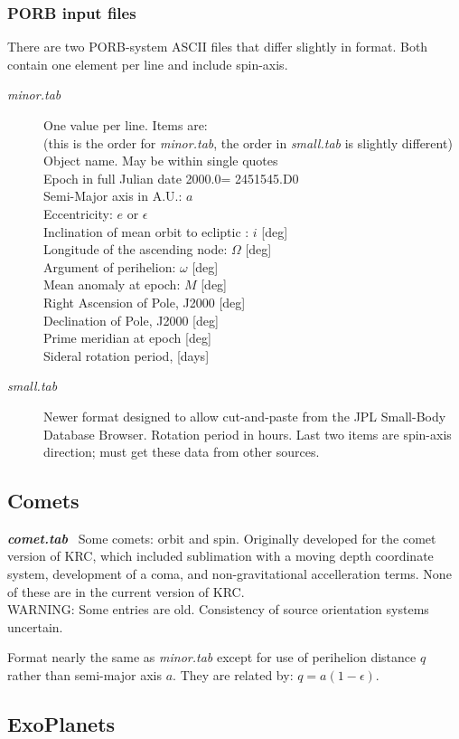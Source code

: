 \documentclass[draft]{article}
\newcommand{\qi}{\\ \hspace*{2.em}}      %
\newcommand{\qii}{\\ \hspace*{4.em}}     %
\newcommand{\nf}{\textit}  %
\begin{document}
\subsubsection{PORB input files} %
There are two PORB-system ASCII files that differ slightly in format. Both
contain one element per line and include spin-axis.

\begin{description} 
 \item [\textit{minor.tab}] One value per line. Items are: 
\qii (this is the order for \nf{minor.tab}, the order in \nf{small.tab} is slightly different)
 \qi Object name. May be within single quotes
 \qi Epoch in full Julian date     2000.0= 2451545.D0 
 \qi Semi-Major axis in A.U.: $a$
 \qi Eccentricity: $e$ or $\epsilon$
 \qi Inclination of mean orbit to ecliptic : $i$ [deg]
 \qi Longitude of the ascending node: $\Omega $ [deg]
 \qi Argument of perihelion: $\omega$ [deg]
 \qi Mean anomaly at epoch: $M$ [deg]
 \qi Right Ascension of Pole, J2000 [deg]
 \qi Declination of Pole, J2000 [deg]
 \qi Prime meridian at epoch [deg]
 \qi Sideral rotation period, [days]

 \item [\textit{small.tab}]  Newer format designed to allow cut-and-paste from the JPL Small-Body Database Browser. Rotation period in hours. Last two items are spin-axis direction; must get these data from other sources.
 \end{description}

\subsection{Comets}

\textbf{\textit{comet.tab}} \  Some comets: orbit and spin. 
Originally developed for the comet version of KRC, which included sublimation with a moving depth coordinate system, development of a coma, and non-gravitational accelleration terms. None of these are in the current version of KRC.
\\ WARNING: Some entries are old. Consistency of source orientation systems uncertain.

Format nearly the same as \nf{minor.tab} except for use of perihelion distance $q$ rather than semi-major axis $a$. They are related by: $q=a(1- \epsilon)$.

\subsection {ExoPlanets}
\end{document}
